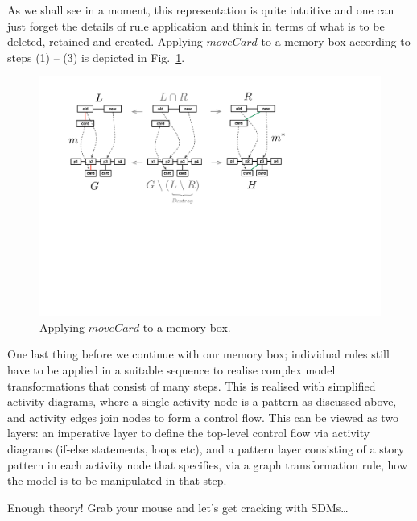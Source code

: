 As we shall see in a moment, this  representation is quite intuitive and one can
just forget the details of rule application and think in terms of what is to be
deleted, retained and created. Applying $moveCard$ to a memory box according to
steps (1) -- (3) is depicted in Fig.~\ref{fig:rule_app_example}.

\begin{figure}[htp] 
\begin{center}
  \includegraphics[width=\textwidth]{pics/rule_app_example}
  \caption[]{Applying $moveCard$ to a memory box.}
  \label{fig:rule_app_example}
\end{center}
\end{figure}

\clearpage 

One last thing before we continue with our memory box; individual rules still
have to be applied in a suitable sequence to realise complex model
transformations that consist of many steps.  This is realised with simplified
activity diagrams, where a single activity node is a pattern as discussed above,
and activity edges join nodes to form a control flow.   This can be viewed as
two layers:  an imperative layer to define the top-level control flow via
activity diagrams (if-else statements, loops etc), and a pattern layer
consisting of a story pattern in each activity node that specifies, via a graph
transformation rule, how the model is to be manipulated in that step.         

Enough theory! Grab your mouse and let's get cracking with SDMs\ldots